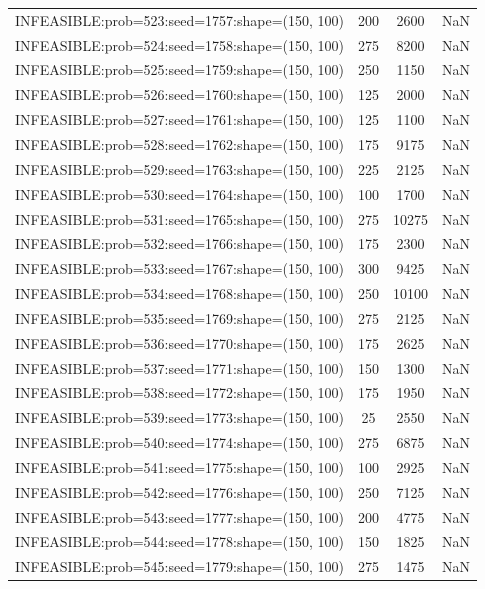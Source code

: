 \begin{longtable}{lccc}
INFEASIBLE:prob=523:seed=1757:shape=(150, 100) &      200 &  2600 &    NaN \\
INFEASIBLE:prob=524:seed=1758:shape=(150, 100) &      275 &  8200 &    NaN \\
INFEASIBLE:prob=525:seed=1759:shape=(150, 100) &      250 &  1150 &    NaN \\
INFEASIBLE:prob=526:seed=1760:shape=(150, 100) &      125 &  2000 &    NaN \\
INFEASIBLE:prob=527:seed=1761:shape=(150, 100) &      125 &  1100 &    NaN \\
INFEASIBLE:prob=528:seed=1762:shape=(150, 100) &      175 &  9175 &    NaN \\
INFEASIBLE:prob=529:seed=1763:shape=(150, 100) &      225 &  2125 &    NaN \\
INFEASIBLE:prob=530:seed=1764:shape=(150, 100) &      100 &  1700 &    NaN \\
INFEASIBLE:prob=531:seed=1765:shape=(150, 100) &      275 & 10275 &    NaN \\
INFEASIBLE:prob=532:seed=1766:shape=(150, 100) &      175 &  2300 &    NaN \\
INFEASIBLE:prob=533:seed=1767:shape=(150, 100) &      300 &  9425 &    NaN \\
INFEASIBLE:prob=534:seed=1768:shape=(150, 100) &      250 & 10100 &    NaN \\
INFEASIBLE:prob=535:seed=1769:shape=(150, 100) &      275 &  2125 &    NaN \\
INFEASIBLE:prob=536:seed=1770:shape=(150, 100) &      175 &  2625 &    NaN \\
INFEASIBLE:prob=537:seed=1771:shape=(150, 100) &      150 &  1300 &    NaN \\
INFEASIBLE:prob=538:seed=1772:shape=(150, 100) &      175 &  1950 &    NaN \\
INFEASIBLE:prob=539:seed=1773:shape=(150, 100) &       25 &  2550 &    NaN \\
INFEASIBLE:prob=540:seed=1774:shape=(150, 100) &      275 &  6875 &    NaN \\
INFEASIBLE:prob=541:seed=1775:shape=(150, 100) &      100 &  2925 &    NaN \\
INFEASIBLE:prob=542:seed=1776:shape=(150, 100) &      250 &  7125 &    NaN \\
INFEASIBLE:prob=543:seed=1777:shape=(150, 100) &      200 &  4775 &    NaN \\
INFEASIBLE:prob=544:seed=1778:shape=(150, 100) &      150 &  1825 &    NaN \\
INFEASIBLE:prob=545:seed=1779:shape=(150, 100) &      275 &  1475 &    NaN \\

\end{longtable}
